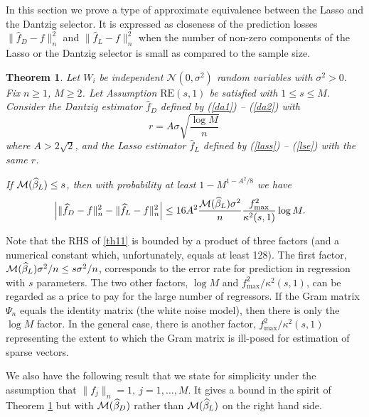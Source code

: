 \documentclass[dvips,aos]{imsart}
\numberwithin{equation}{section}
\theoremstyle{plain}
\newtheorem{thm}{Theorem}[section]%
\def\wideth{\widehat}
\def\scm{{\cal M}}
\def\wh{\widehat}
\def\RE#1#2{$\text{RE}(#1,#2)$}
\begin{document}
In this section we prove a type of approximate equivalence between the Lasso
and the Dantzig selector. It is expressed as closeness of the prediction
losses $\| \widehat f_D -f\|_n^2$ and $\| \wideth{f}_L -f \|_n^2$ when the
number of non-zero components of the Lasso or the Dantzig selector  is small
as compared to the sample size.
\begin{thm}\label{th1}
Let  $W_i$ be independent ${\mathcal N}(0,\sigma^2)$ random
variables with $\sigma^2>0$. Fix $n\ge1$, $M\ge2$. Let Assumption
\RE s1 be satisfied with $1\le s\le M$. Consider the Dantzig
estimator $\wideth{f}_D$ defined by (\ref{da1}) -- (\ref{da2}) with
$$
r= A\sigma \sqrt{\frac{\log M}{n}}\,
$$
where $A>2\sqrt 2$, and the Lasso estimator $\wideth{f}_L$ defined
by (\ref{lass}) -- (\ref{lse}) with the same $r$.

If $\scm(\wh\beta_L)\le s$, then with probability at least
$1-M^{1-A^2/8}$ we have
\begin{equation}\begin{split}\label{th11}
&\Bigl| \| \wideth f_D -f\|_n^2 - \| \wideth{f}_L -f \|_n^2\Bigr| \leq
16 A^2 \frac{\scm(\wh\beta_L)\sigma^2}{n}\frac{f_{\max}^2}{\kappa^2(s,1)}
\log M.
\end{split}\end{equation}

\end{thm}

Note that the RHS of \eqref{th11}  is bounded by a product of three
factors (and a numerical constant which, unfortunately, equals at
least 128). The first factor, $\scm(\wh\beta_L)\sigma^2/n \le
s\sigma^2/n$, corresponds to the error rate for prediction in
regression with $s$ parameters. The two other factors, $\log M$ and
$f^2_{\max}/\kappa^2(s,1)$, can be regarded as a price to pay for
the large number of regressors. If the Gram matrix $\Psi_n$ equals
the identity matrix (the white noise model), then there is only the
$\log M$ factor. In the general case, there is another factor,
$f^2_{\max}/\kappa^2(s,1)$ representing the extent to which the Gram
matrix is ill-posed for estimation of sparse vectors.

We also have the following result that we state for simplicity under
the assumption that $\|f_j\|_n=1,\ j=1,\ldots,M$. It gives a bound
in the spirit of Theorem \ref{th1} but with $\scm(\wh\beta_D)$
rather than $\scm(\wh\beta_L)$ on the right hand side.
\end{document}
